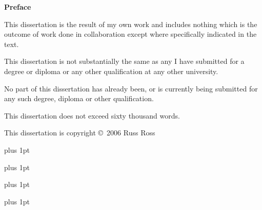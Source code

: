 \vspace*{\fill}

{\Huge \bf \noindent Preface}
\vspace{0.4in}

\noindent This dissertation is the result of my own work and includes nothing which is
the outcome of work done in collaboration except where specifically indicated
in the text.

\noindent This dissertation is not substantially the same as any I have submitted for a
degree or diploma or any other qualification at any other university.

\noindent No part of this dissertation has already been, or is currently being submitted
for any such degree, diploma or other qualification.

\noindent This dissertation does not exceed sixty thousand words.

\vspace{0.4in}

\noindent This dissertation is copyright \copyright~2006 Russ Ross

\cleardoublepage

%

{
  \parskip 0pt plus 1pt
  \tableofcontents
}

\cleardoublepage

%

{
  \parskip 0pt plus 1pt
  \listoffigures
}

\cleardoublepage

%

{
  \parskip 0pt plus 1pt
  \listoftables
}

\cleardoublepage

%

{
  \parskip 0pt plus 1pt
  
}

\cleardoublepage

%

%  


